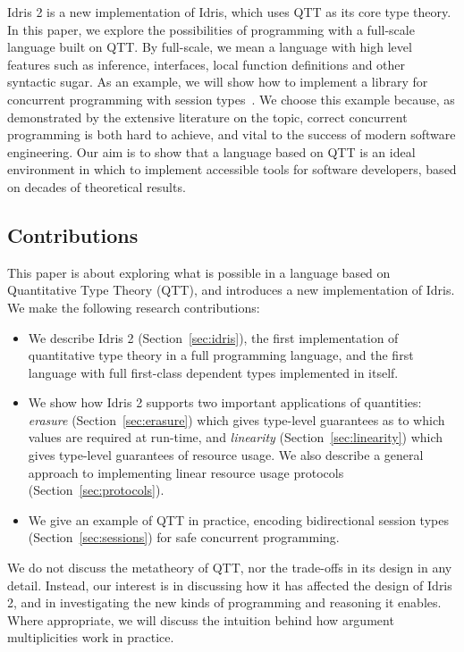 Idris 2 is a new implementation of Idris, which uses QTT as its core
type theory. In this paper, we explore the possibilities of programming with
a full-scale language built on QTT. By full-scale, we mean a language with high
level features such as inference, interfaces, local function definitions
and other syntactic sugar. As an example, we will show how to implement a
library for concurrent programming with session types~\cite{Honda1993}.
We choose this example because, as demonstrated by the extensive literature
on the topic, correct concurrent programming is both hard to achieve, and
vital to the success of modern software engineering. Our aim is to show that
a language based on QTT is an ideal environment in
which to implement accessible tools for software developers, based on
decades of theoretical results.


\subsection{Contributions}

This paper is about exploring what is possible in a language based on
Quantitative Type Theory (QTT), and introduces a new implementation of Idris.
We make the following research contributions:

\begin{itemize}
\item We describe Idris 2 (Section~\ref{sec:idris}), the first implementation
of quantitative type theory in a full programming language, and the first
language with full first-class dependent types implemented in itself.
\item We show how Idris 2 supports two important applications of quantities:
\emph{erasure} (Section~\ref{sec:erasure}) which gives type-level guarantees as
to which values are required at run-time, and \emph{linearity}
(Section~\ref{sec:linearity}) which gives type-level guarantees of resource
usage. We also describe a general approach to implementing linear
resource usage protocols (Section~\ref{sec:protocols}).
\item We give an example of QTT in practice, encoding bidirectional
session types (Section~\ref{sec:sessions}) for safe concurrent programming.
\end{itemize}

We do not discuss the metatheory of QTT, nor the trade-offs in its design
in any detail. Instead, our interest is in discussing how it has affected
the design of Idris 2, and in investigating the new kinds of programming and
reasoning it enables. Where appropriate, we will discuss the intuition behind
how argument multiplicities work in practice.


